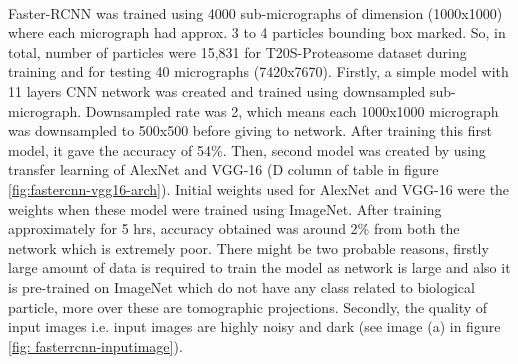 \documentclass[twoside]{iitbreport}
\begin{document}
\noindent\\
Faster-RCNN was trained using 4000 sub-micrographs of dimension (1000x1000) where each micrograph had approx. 3 to 4 particles bounding box marked. So, in total, number of particles were 15,831 for T20S-Proteasome dataset during training and for testing 40 micrographs (7420x7670). Firstly, a simple model with 11 layers CNN network was created and trained using downsampled sub-micrograph. Downsampled rate was 2, which means each 1000x1000 micrograph was downsampled to 500x500 before giving to network. After training this first model, it gave the accuracy of 54\%. Then, second model was created by using transfer learning of AlexNet and VGG-16 \cite{vgg16_simonyan2014very} (D column of table in figure \ref{fig:fastercnn-vgg16-arch}). Initial weights used for AlexNet and VGG-16 were the weights when these model were trained using ImageNet. After training approximately for 5 hrs, accuracy obtained was around 2\% from both the network which is extremely poor. There might be two probable reasons, firstly large amount of data is required to train the model as network is large and also it is pre-trained on ImageNet which do not have any class related to biological particle, more over these are tomographic projections. Secondly, the quality of input images i.e. input images are highly noisy and dark (see image (a) in figure \ref{fig: fasterrcnn-inputimage}). 
\end{document}
